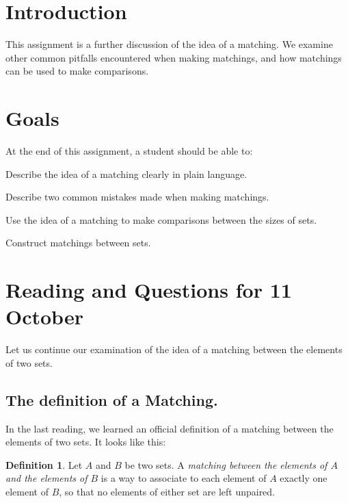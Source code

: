 \documentclass[12pt,letterpaper]{article}
\theoremstyle{definition}
\newtheorem*{definition}{Definition}
\begin{document}
\setlength{\parskip}{1ex plus 0.5ex minus 0.2ex}
\setlength{\parindent}{0pt}

\pagestyle{fancy}
\cfoot{}

\section*{Introduction}
This assignment is a further discussion of the idea of a matching.
We examine other common pitfalls encountered when making matchings, and how matchings can be used to make comparisons.

\section*{Goals}
At the end of this assignment, a student should be able to:
\begin{compactitem}
\item Describe the idea of a matching clearly in plain language.
\item Describe two common mistakes made when making matchings.
\item Use the idea of a matching to make comparisons between the sizes of sets.
\item Construct matchings between sets.
\end{compactitem}


\section*{Reading and Questions for 11 October}

Let us continue our examination of the idea of a matching between the elements of two sets.

\subsection*{The definition of a Matching.}
In the last reading, we learned an official definition of a matching between the elements of two sets.
It looks like this:
\begin{definition}
Let $A$ and $B$ be two sets.
A \emph{matching between the elements of $A$ and the elements of $B$} is a way to associate to each element of $A$ exactly one element of $B$, so that no elements of either set are left unpaired.
\end{definition}
\end{document}
